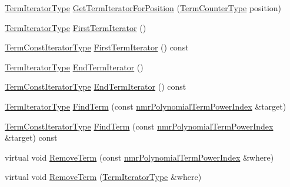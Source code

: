 \begin{DoxyCompactItemize}
\item 
\hyperlink{classnmr_polynomial_container_a276e57445d038e8a16462f47b85719a3}{Term\+Iterator\+Type} \hyperlink{classnmr_polynomial_container_aa67592164a3279435821dafeef6da287}{Get\+Term\+Iterator\+For\+Position} (\hyperlink{classnmr_polynomial_base_a4b0abd66b12b6f5bfb30d0eb1607e661}{Term\+Counter\+Type} position)
\item 
\hyperlink{classnmr_polynomial_container_a276e57445d038e8a16462f47b85719a3}{Term\+Iterator\+Type} \hyperlink{classnmr_polynomial_container_ae7f1d8d2a7a436d50f037eca26a2d071}{First\+Term\+Iterator} ()
\item 
\hyperlink{classnmr_polynomial_container_aba8d31506ab6a487fdc4fe2815469442}{Term\+Const\+Iterator\+Type} \hyperlink{classnmr_polynomial_container_a35d115a7a1de687fbd430fc3e72d1852}{First\+Term\+Iterator} () const 
\item 
\hyperlink{classnmr_polynomial_container_a276e57445d038e8a16462f47b85719a3}{Term\+Iterator\+Type} \hyperlink{classnmr_polynomial_container_a35de8fd324e8a82fafd8b1f142454f52}{End\+Term\+Iterator} ()
\item 
\hyperlink{classnmr_polynomial_container_aba8d31506ab6a487fdc4fe2815469442}{Term\+Const\+Iterator\+Type} \hyperlink{classnmr_polynomial_container_a6f91158da45a46d4e893d2f12fe66c0e}{End\+Term\+Iterator} () const 
\item 
\hyperlink{classnmr_polynomial_container_a276e57445d038e8a16462f47b85719a3}{Term\+Iterator\+Type} \hyperlink{classnmr_polynomial_container_a0e60c3316d2eb4bd648060f86277f965}{Find\+Term} (const \hyperlink{classnmr_polynomial_term_power_index}{nmr\+Polynomial\+Term\+Power\+Index} \&target)
\item 
\hyperlink{classnmr_polynomial_container_aba8d31506ab6a487fdc4fe2815469442}{Term\+Const\+Iterator\+Type} \hyperlink{classnmr_polynomial_container_a90f2dabc7119967f2eae12e5dc8df03d}{Find\+Term} (const \hyperlink{classnmr_polynomial_term_power_index}{nmr\+Polynomial\+Term\+Power\+Index} \&target) const 
\item 
virtual void \hyperlink{classnmr_polynomial_container_a550fbc8732a929a79236887f0fdddd4c}{Remove\+Term} (const \hyperlink{classnmr_polynomial_term_power_index}{nmr\+Polynomial\+Term\+Power\+Index} \&where)
\item 
virtual void \hyperlink{classnmr_polynomial_container_a9fc6e6c406c10d615d3cf5a97926720f}{Remove\+Term} (\hyperlink{classnmr_polynomial_container_a276e57445d038e8a16462f47b85719a3}{Term\+Iterator\+Type} \&where)
\item 

\end{DoxyCompactItemize}
